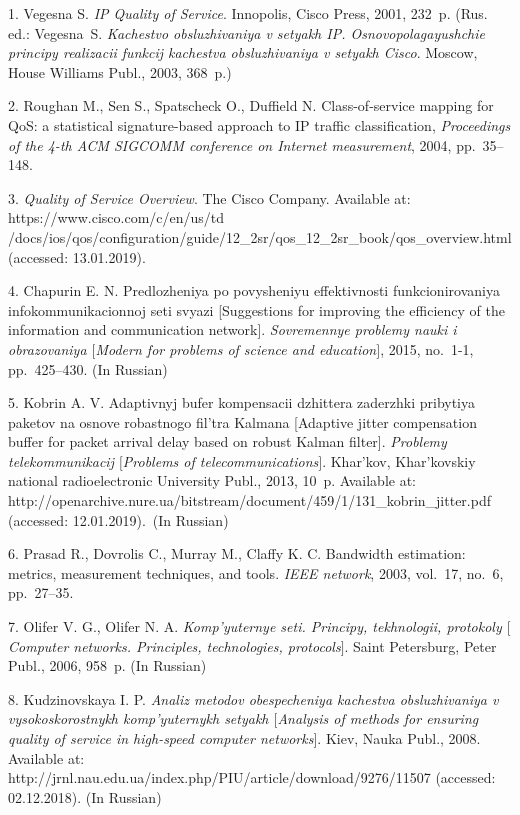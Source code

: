 {\footnotesize

1. Vegesna S. {\it IP Quality of Service}. Innopolis, Cisco Press,
2001, 232~p. (Rus. ed.: Vegesna~S. {\it Kachestvo obsluzhivaniya v
setyakh IP. Osnovopolagayushchie principy realizacii funkcij
kachestva ob\-slu\-zhi\-vaniya v setyakh Cisco}. Moscow, House
Williams Publ., 2003, 368~p.)

2. Roughan M., Sen S., Spatscheck O., Duffield N. Class-of-service
mapping for QoS: a statistical signature-based approach to IP
traffic classification, {\it Proceedings of the 4-th ACM SIGCOMM
conference on Internet measurement}, 2004, pp.~35--148.

3. {\it Quality of Service Overview}. The Cisco Company. Available
at: https://www.cisco.com/c/en/us/td  \\
/docs/ios/qos/configuration/guide/12\_2sr/qos\_12\_2sr\_book/qos\_overview.html
(accessed: 13.01.2019).

4. Chapurin E. N. Predlozheniya po povysheniyu effektivnosti
funkcionirovaniya infokommunika\-cionnoj seti svyazi [Suggestions
for improving the efficiency of the information and communication
network]. {\it Sovremennye problemy nauki i obrazovaniya $[$Modern
for problems of science and education$]$}, 2015, no.~1-1,
pp.~425--430. (In Russian)

5. Kobrin A. V. Adaptivnyj bufer kompensacii dzhittera zaderzhki
pribytiya paketov na osnove robastnogo fil'tra Kalmana [Adaptive
jitter compensation buffer for packet arrival delay based on
robust Kalman filter]. {\it Problemy telekommunikacij $[$Problems
of telecommunications$]$}. Khar'kov, Khar'kovskiy national
radioelectronic University Publ., 2013, 10~p. Available at:\\
http://openarchive.nure.ua/bitstream/document/459/1/131\_kobrin\_jitter.pdf
(accessed: 12.01.2019).~(In Russian)

6. Prasad R., Dovrolis C., Murray M., Claffy K. C. Bandwidth
estimation: metrics, measurement techniques, and tools. {\it IEEE
network}, 2003, vol.~17, no.~6, pp.~27--35.

7. Olifer V. G., Olifer N. A. {\it Komp'yuternye seti. Principy,
tekhnologii, protokoly $[$Computer networks. Principles,
technologies, protocols$]$}. Saint Pe\-ters\-burg, Peter Publ.,
2006, 958~p. (In Russian)

8. Kudzinovskaya I. P. {\it Analiz metodov obespecheniya kachestva
obsluzhivaniya v vysokoskorostnykh komp'yuternykh setyakh
$[$Analysis of methods for ensuring quality of service in
high-speed computer networks$]$}. Kiev, Nauka Publ., 2008.
Available at:\\
http://jrnl.nau.edu.ua/index.php/PIU/article/download/9276/11507
(accessed: 02.12.2018). (In Russian)

}
